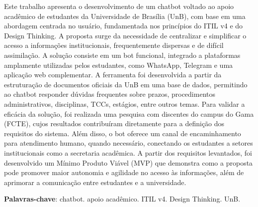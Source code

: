 \begin{resumo}
Este trabalho apresenta o desenvolvimento de um chatbot voltado ao apoio acadêmico de estudantes da Universidade de Brasília (UnB), com base em uma abordagem centrada no usuário, fundamentada nos princípios do ITIL v4 e do Design Thinking. A proposta surge da necessidade de centralizar e simplificar o acesso a informações institucionais, frequentemente dispersas e de difícil assimilação. A solução consiste em um bot funcional, integrado a plataformas amplamente utilizadas pelos estudantes, como WhatsApp, Telegram e uma aplicação web complementar. A ferramenta foi desenvolvida a partir da estruturação de documentos oficiais da UnB em uma base de dados, permitindo ao chatbot responder dúvidas frequentes sobre prazos, procedimentos administrativos, disciplinas, TCCs, estágios, entre outros temas. Para validar a eficácia da solução, foi realizada uma pesquisa com discentes do campus do Gama (FCTE), cujos resultados contribuíram diretamente para a definição dos requisitos do sistema. Além disso, o bot oferece um canal de encaminhamento para atendimento humano, quando necessário, conectando os estudantes a setores institucionais como a secretaria acadêmica. A partir dos requisitos levantados, foi desenvolvido um Mínimo Produto Viável (MVP) que demonstra como a proposta pode promover maior autonomia e agilidade no acesso às informações, além de aprimorar a comunicação entre estudantes e a universidade.

 \vspace{\onelineskip}
    
 \noindent
 \textbf{Palavras-chave}:  chatbot. apoio acadêmico. ITIL v4. Design Thinking. UnB.
\end{resumo}
